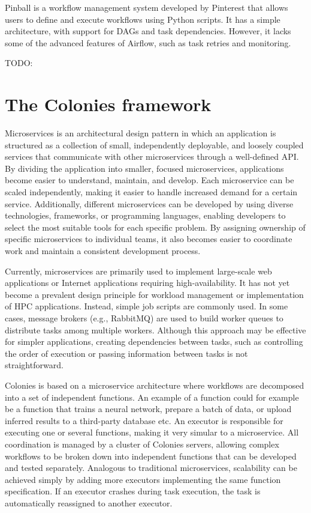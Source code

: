 \documentclass{article}
\begin{document}
Pinball is a workflow management system developed by Pinterest that allows users to define and execute workflows using Python scripts. It has a simple architecture, with support for DAGs and task dependencies. However, it lacks some of the advanced features of Airflow, such as task retries and monitoring.

TODO: 

\section{The Colonies framework}
\label{sec:headings}
Microservices is an architectural design pattern in which an application is structured as a collection of small, independently deployable, and loosely coupled services that communicate with other microservices through a well-defined API. By dividing the application into smaller, focused microservices, applications become easier to understand, maintain, and develop. Each microservice can be scaled independently, making it easier to handle increased demand for a certain service. Additionally, different microservices can be developed by using diverse technologies, frameworks, or programming languages, enabling developers to select the most suitable tools for each specific problem. By assigning ownership of specific microservices to individual teams, it also becomes easier to coordinate work and maintain a consistent development process.

Currently, microservices are primarily used to implement large-scale web applications or Internet applications requiring high-availability. It has not yet become a prevalent design principle for workload management or implementation of HPC applications. Instead, simple job scripts are commonly used. In some cases, message brokers (e.g., RabbitMQ) are used to build worker queues to distribute tasks among multiple workers. Although this approach may be effective for simpler applications, creating dependencies between tasks, such as controlling the order of execution or passing information between tasks is not straightforward.

Colonies is based on a microservice architecture where workflows are decomposed into a set of independent functions. An example of a function could for example be a function that trains a neural network, prepare a batch of data, or upload inferred results to a third-party database etc. An executor is responsible for executing one or several functions, making it very simular to a microservice. All coordination is managed by a cluster of Colonies servers, allowing complex workflows to be broken down into independent functions that can be developed and tested separately. Analogous to traditional microservices, scalability can be achieved simply by adding more executors implementing the same function specification. If an executor crashes during task execution, the task is automatically reassigned to another executor. 
\end{document}
